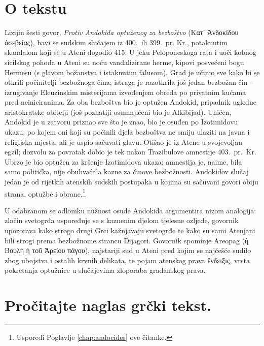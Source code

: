 
\section*{O tekstu}

Lizijin šesti govor, \textit{Protiv Andokida optuženog za bezboštvo} \textgreek{(Κατ' Ἀνδοκίδου ἀσεβείας),} bavi se sudskim slučajem iz 400.\ ili 399.\ pr. Kr., potaknutim skandalom koji se u Ateni dogodio 415. U jeku Peloponeskoga rata i uoči kobnog sicilskog pohoda u Ateni su noću vandalizirane herme, kipovi posvećeni bogu Hermesu (s glavom božanstva i istaknutim falusom). Grad je učinio sve kako bi se otkrili počinitelji bezbožnoga čina; istraga je razotkrila još jedan bezbožan čin – izrugivanje Eleuzinskim misterijama izvođenjem obreda po privatnim kućama pred neiniciranima. Za oba bezboštva bio je optužen Andokid, pripadnik ugledne aristokratske obitelji (još poznatiji osumnjičeni bio je Alkibijad). Uhićen, Andokid je u zatvoru priznao sve što je znao, bio je osuđen po Izotimidovu ukazu, po kojem oni koji su počinili djela bezboštva ne smiju ulaziti na javna i religijska mjesta, ali je uspio sačuvati glavu. Otišao je iz Atene u svojevoljan egzil; dozvolu za povratak dobio je tek nakon Trazibulove amnestije 403.\ pr.~Kr. Ubrzo je bio optužen za kršenje Izotimidova ukaza; amnestija je, naime, bila samo politička, nije obuhvaćala kazne za činove bezbožnosti. Andokidov slučaj jedan je od rijetkih atenskih sudskih postupaka u kojima su sačuvani govori obiju strana, optužbe i obrane.\footnote{Usporedi Poglavlje \ref{chap:andocides} ove čitanke.}

U odabranom se odlomku nužnost osude Andokida argumentira nizom analogija: zločin svetogrđa uspoređuje se s kaznenim djelom tjelesne ozljede, govornik upozorava kako strogo drugi Grci kažnjavaju svetogrđe te kako su sami Atenjani bili strogi prema bezbožnome strancu Dijagori. Govornik spominje Areopag \textgreek{(ἡ Βουλὴ ἡ τοῦ Ἀρείου πάγου),} najstariji sud u Ateni pred kojim se najčešće sudilo zbog ubojstva i ostalih krvnih delikata, te pojam atenskog prava \textgreek{ἔνδειξις,} vrsta pokretanja optužnice u slučajevima zloporaba građanskog prava. 



\section*{Pročitajte naglas grčki tekst.}

